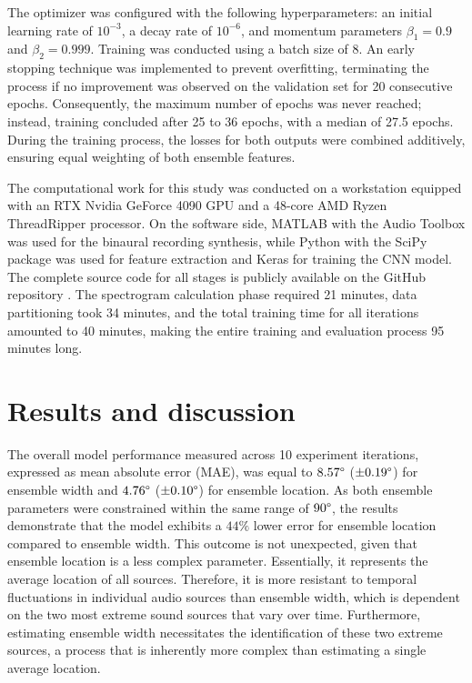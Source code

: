 \documentclass[11pt]{article}
\begin{document}
The optimizer was configured with the following hyperparameters: an initial learning rate of $10^{-3}$, a decay rate of $10^{-6}$, and momentum parameters $\beta_1 = 0.9$ and $\beta_2 = 0.999$. Training was conducted using a batch size of 8. An early stopping technique was implemented to prevent overfitting, terminating the process if no improvement was observed on the validation set for 20 consecutive epochs. Consequently, the maximum number of epochs was never reached; instead, training concluded after 25 to 36 epochs, with a median of 27.5 epochs. During the training process, the losses for both outputs were combined additively, ensuring equal weighting of both ensemble features.

The computational work for this study was conducted on a workstation equipped with an RTX Nvidia GeForce 4090 GPU and a 48-core AMD Ryzen ThreadRipper processor. On the software side, MATLAB \parencite{MATLAB} with the Audio Toolbox \parencite{MATLAB_Audio_Toolbox} was used for the binaural recording synthesis, while Python \parencite{python} with the SciPy package \parencite{2020SciPy-NMeth} was used for feature extraction and Keras \parencite{chollet_keras_2015} for training the CNN model. The complete source code for all stages is publicly available on the GitHub repository \parencite{antoniuk_software_2024}. The spectrogram calculation phase required 21 minutes, data partitioning took 34 minutes, and the total training time for all iterations amounted to 40 minutes, making the entire training and evaluation process 95 minutes long.

\section{Results and discussion}
\label{sec:results}

The overall model performance measured across 10 experiment iterations, expressed as mean absolute error (MAE), was equal to $8.57\degree$ ($\pm0.19\degree$) for ensemble width and $4.76\degree$ ($\pm0.10\degree$) for ensemble location. As both ensemble parameters were constrained within the same range of $90\degree$, the results demonstrate that the model exhibits a $44\%$ lower error for ensemble location compared to ensemble width. This outcome is not unexpected, given that ensemble location is a less complex parameter. Essentially, it represents the average location of all sources. Therefore, it is more resistant to temporal fluctuations in individual audio sources than ensemble width, which is dependent on the two most extreme sound sources that vary over time. Furthermore, estimating ensemble width necessitates the identification of these two extreme sources, a process that is inherently more complex than estimating a single average location.
\end{document}
